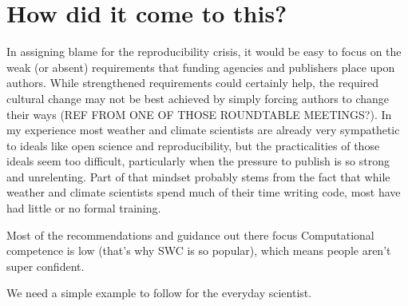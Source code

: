 \section{How did it come to this?}

In assigning blame for the reproducibility crisis, it would be easy to focus on the weak (or absent) requirements that funding agencies and publishers place upon authors. While strengthened requirements could certainly help, the required cultural change may not be best achieved by simply forcing authors to change their ways (REF FROM ONE OF THOSE ROUNDTABLE MEETINGS?). In my experience most weather and climate scientists are already very sympathetic to ideals like open science and reproducibility, but the practicalities of those ideals seem too difficult, particularly when the pressure to publish is so strong and unrelenting. Part of that mindset probably stems from the fact that while weather and climate scientists spend much of their time writing code, most have had little or no formal training. 


Most of the recommendations and guidance out there focus 
Computational competence is low (that's why SWC is so popular), which means people aren't super confident. 

We need a simple example to follow for the everyday scientist.